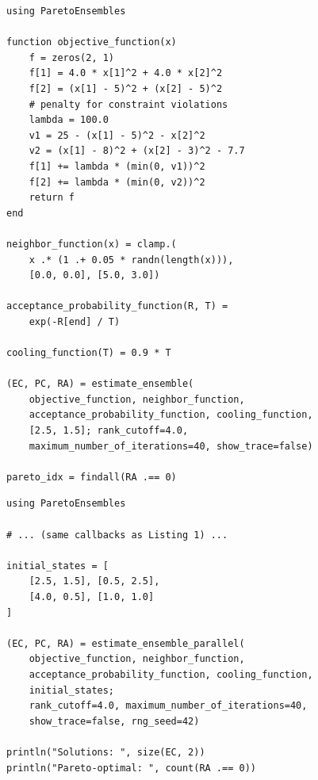 \documentclass[preprint,review,12pt]{elsarticle}
\begin{document}
\begin{lstlisting}[caption={Binh--Korn benchmark with ParetoEnsembles.jl.},label={lst:binhkorn}]
using ParetoEnsembles

function objective_function(x)
    f = zeros(2, 1)
    f[1] = 4.0 * x[1]^2 + 4.0 * x[2]^2
    f[2] = (x[1] - 5)^2 + (x[2] - 5)^2
    # penalty for constraint violations
    lambda = 100.0
    v1 = 25 - (x[1] - 5)^2 - x[2]^2
    v2 = (x[1] - 8)^2 + (x[2] - 3)^2 - 7.7
    f[1] += lambda * (min(0, v1))^2
    f[2] += lambda * (min(0, v2))^2
    return f
end

neighbor_function(x) = clamp.(
    x .* (1 .+ 0.05 * randn(length(x))),
    [0.0, 0.0], [5.0, 3.0])

acceptance_probability_function(R, T) =
    exp(-R[end] / T)

cooling_function(T) = 0.9 * T

(EC, PC, RA) = estimate_ensemble(
    objective_function, neighbor_function,
    acceptance_probability_function, cooling_function,
    [2.5, 1.5]; rank_cutoff=4.0,
    maximum_number_of_iterations=40, show_trace=false)

pareto_idx = findall(RA .== 0)
\end{lstlisting}

\begin{lstlisting}[caption={Multi-chain parallel execution on the Binh--Korn problem (requires \texttt{julia -t4}).},label={lst:parallel}]
using ParetoEnsembles

# ... (same callbacks as Listing 1) ...

initial_states = [
    [2.5, 1.5], [0.5, 2.5],
    [4.0, 0.5], [1.0, 1.0]
]

(EC, PC, RA) = estimate_ensemble_parallel(
    objective_function, neighbor_function,
    acceptance_probability_function, cooling_function,
    initial_states;
    rank_cutoff=4.0, maximum_number_of_iterations=40,
    show_trace=false, rng_seed=42)

println("Solutions: ", size(EC, 2))
println("Pareto-optimal: ", count(RA .== 0))
\end{lstlisting}
\end{document}
